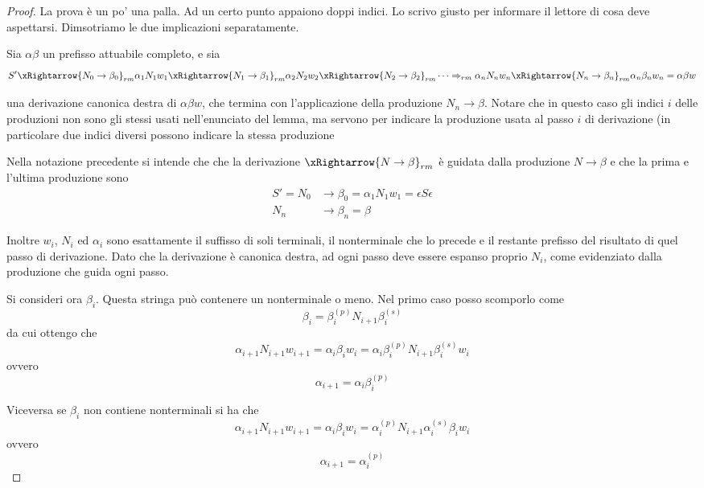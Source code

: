 \documentclass[12pt]{article}
\numberwithin{theorem}{subsection}
\begin{document}
\begin{proof}
	La prova è un po' una palla. Ad un certo punto appaiono doppi indici. Lo scrivo giusto per informare il lettore di cosa deve aspettarsi. Dimsotriamo le due implicazioni separatamente.
	
	\vspace{0.8cm}
	Sia $\alpha \beta$ un prefisso attuabile completo, e sia
	\[
	S' \xRightarrow{N_0 \rightarrow \beta_0}_{rm} \alpha_1 N_1 w_1 \xRightarrow{N_1 \rightarrow \beta_1}_{rm} \alpha_2 N_2 w_2 \xRightarrow{N_2 \rightarrow \beta_2}_{rm} \dots \Rightarrow_{rm} \alpha_n N_n w_n \xRightarrow{N_n \rightarrow \beta_n}_{rm} \alpha_n \beta_n w_n = \alpha \beta w
	\]
	
	una derivazione canonica destra di $\alpha \beta w$, che termina con l'applicazione della produzione $N_n \rightarrow \beta$.
	Notare che in questo caso gli indici $i$ delle produzioni non sono gli stessi usati nell'enunciato del lemma, ma servono per indicare la produzione usata al passo $i$ di derivazione (in particolare due indici diversi possono indicare la stessa produzione
	
	Nella notazione precedente si intende che che la derivazione $\xRightarrow{N \rightarrow \beta}_{rm}$ è guidata dalla produzione $N \rightarrow \beta$ e che la prima e l'ultima produzione sono
	\begin{align*}
	S' = N_0 &\rightarrow \beta_0 = \alpha_1 N_1 w_1 = \epsilon S \epsilon\\
	N_n &\rightarrow \beta_n = \beta
	\end{align*}
	
	Inoltre $w_i$, $N_i$ ed $\alpha_i$ sono esattamente il suffisso di soli terminali, il nonterminale che lo precede e il restante prefisso del risultato di quel passo di derivazione. Dato che la derivazione è canonica destra, ad ogni passo deve essere espanso proprio $N_i$, come evidenziato dalla produzione che guida ogni passo.
	
	Si consideri ora $\beta_i$. Questa stringa può contenere un nonterminale o meno. Nel primo caso posso scomporlo come
	\[
	\beta_i = \beta_i^{(p)} N_{i+1} \beta_i^{(s)}
	\]
	da cui ottengo che
	\[
	\alpha_{i+1} N_{i+1} w_{i+1} = \alpha_i \beta_i w_i = \alpha_i \beta_i^{(p)} N_{i+1} \beta_i^{(s)} w_i
	\]
	ovvero
	\[
	\alpha_{i+1} = \alpha_i \beta_i^{(p)}
	\]
	
	Viceversa se $\beta_i$ non contiene nonterminali si ha che
	\[
	\alpha_{i+1} N_{i+1} w_{i+1} = \alpha_i \beta_i w_i = \alpha_i^{(p)} N_{i+1} \alpha_i^{(s)} \beta_i w_i
	\]
	ovvero
	\[
	\alpha_{i+1} = \alpha_i^{(p)}
	\]
	

\end{proof}
\end{document}
